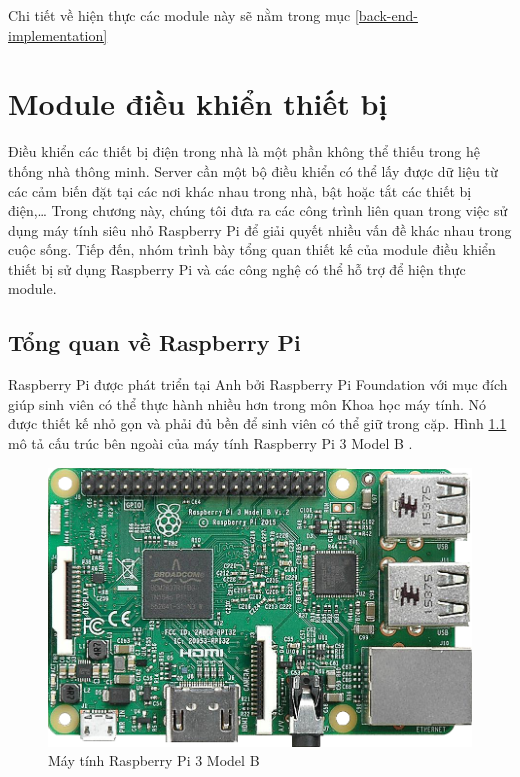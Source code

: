\documentclass[12pt,a4paper,oneside]{extbook}
\begin{document}
\noindent
Chi tiết về hiện thực các module này sẽ nằm trong mục \ref{back-end-implementation}

\chapter{Module điều khiển thiết bị}
Điều khiển các thiết bị điện trong nhà là một phần không thể thiếu trong hệ thống nhà thông minh. Server cần một bộ điều khiển có thể lấy được dữ liệu từ các cảm biến đặt tại các nơi khác nhau trong nhà, bật hoặc tắt các thiết bị điện,\dots\hspace{0mm} Trong chương này, chúng tôi đưa ra các công trình liên quan trong việc sử dụng máy tính siêu nhỏ Raspberry Pi để giải quyết nhiều vấn đề khác nhau trong cuộc sống. Tiếp đến, nhóm trình bày tổng quan thiết kế của module điều khiển thiết bị sử dụng Raspberry Pi và các công nghệ có thể hỗ trợ để hiện thực module.

\section{Tổng quan về Raspberry Pi}
Raspberry Pi được phát triển tại Anh bởi Raspberry Pi Foundation với mục đích giúp sinh viên có thể thực hành nhiều hơn trong môn Khoa học máy tính. Nó được thiết kế nhỏ gọn và phải đủ bền để sinh viên có thể giữ trong cặp. Hình \ref{fig:4-pi3-model-b} mô tả cấu trúc bên ngoài của máy tính Raspberry Pi 3 Model B \cite{pi-for-dummies}\cite{pi-wiki}.

\begin{figure}[h]
  \centering
     \includegraphics[scale=0.3]{4-pi3-model-b}
  \caption{Máy tính Raspberry Pi 3 Model B}\label{fig:4-pi3-model-b}
\end{figure}
\end{document}
